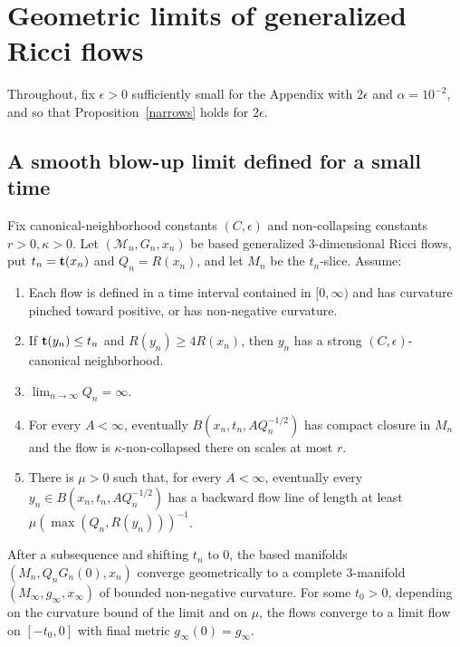 \chapter{Geometric limits of generalized Ricci flows}
\label{chap:geometric-limits}

Throughout, fix $\epsilon>0$ sufficiently small for the Appendix with
$2\epsilon$ and $\alpha=10^{-2}$, and so that Proposition~\ref{narrows}
holds for $2\epsilon$.

\section{A smooth blow-up limit defined for a small time}

\begin{theorem}
\label{thm:short-time-blowup-limit}
\label{smlmtflow}
Fix canonical-neighborhood constants $(C,\epsilon)$ and non-collapsing
constants $r>0,\kappa>0$. Let $({\mathcal M}_n,G_n,x_n)$ be based
generalized $3$-dimensional Ricci flows, put $t_n={\bf t}(x_n)$ and
$Q_n=R(x_n)$, and let $M_n$ be the $t_n$-slice. Assume:
\begin{enumerate}
\item[(1)] Each flow is defined in a time interval contained in
$[0,\infty)$ and has curvature pinched toward positive, or has
non-negative curvature.
\item[(2)] If ${\bf t}(y_n)\le t_n$ and $R(y_n)\ge4R(x_n)$, then
$y_n$ has a strong $(C,\epsilon)$-canonical neighborhood.
\item[(3)] $\lim_{n\to\infty}Q_n=\infty$.
\item[(4)] For every $A<\infty$, eventually
$B(x_n,t_n,AQ_n^{-1/2})$ has compact closure in $M_n$ and the flow is
$\kappa$-non-collapsed there on scales at most $r$.
\item[(5)] There is $\mu>0$ such that, for every $A<\infty$, eventually
every $y_n\in B(x_n,t_n,AQ_n^{-1/2})$ has a backward flow line of length at
least $\mu(\max(Q_n,R(y_n)))^{-1}$.
\end{enumerate}
After a subsequence and shifting $t_n$ to $0$, the based manifolds
$(M_n,Q_nG_n(0),x_n)$ converge geometrically to a complete $3$-manifold
$(M_\infty,g_\infty,x_\infty)$ of bounded non-negative curvature. For some
$t_0>0$, depending on the curvature bound of the limit and on $\mu$, the
flows converge to a limit flow on $[-t_0,0]$ with final metric
$g_\infty(0)=g_\infty$.
\end{theorem}


